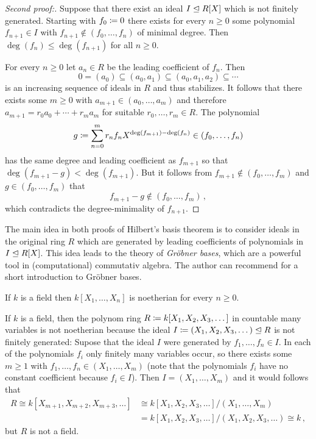 \begin{proof}[Second proof:]
  Suppose that there exist an ideal $I \trianglelefteq R[X]$ which is not finitely generated.
  Starting with $f_0 \coloneqq 0$ there exists for every $n \geq 0$ some polynomial $f_{n+1} \in I$ with $f_{n+1} \notin (f_0, \dotsc, f_n)$ of minimal degree.
  Then $\deg(f_n) \leq \deg(f_{n+1})$ for all $n \geq 0$.
  
  For every $n \geq 0$ let $a_n \in R$ be the leading coefficient of $f_n$.
  Then
  \[
              0
    =         (a_0)
    \subseteq (a_0, a_1)
    \subseteq (a_0, a_1, a_2)
    \subseteq \dotsb
  \]
  is an increasing sequence of ideals in $R$ and thus stabilizes.
  It follows that there exists some $m \geq 0$ with $a_{m+1} \in (a_0, \dotsc, a_m)$ and therefore $a_{m+1} = r_0 a_0 + \dotsb + r_m a_m$ for suitable $r_0, \dotsc, r_m \in R$.
  The polynomial
  \[
              g
    \coloneqq  \sum_{n=0}^m r_n f_n X^{\deg(f_{m+1}) - \deg(f_n)}
    \in       (f_0, \dotsc, f_n)
  \]
  has the same degree and leading coefficient as $f_{m+1}$ so that $\deg(f_{m+1} - g) < \deg(f_{m+1})$.
  But it follows from $f_{m+1} \notin (f_0, \dotsc, f_m)$ and $g \in (f_0, \dotsc, f_m)$ that
  \[
            f_{m+1} - g
    \notin  (f_0, \dotsc, f_m) \,,
  \]
  which contradicts the degree-minimality of $f_{n+1}$.
\end{proof}


\begin{remark}
  The main idea in both proofs of Hilbert’s basis theorem is to consider ideals in the original ring $R$ which are generated by leading coefficients of polynomials in $I \trianglelefteq R[X]$.
  This idea leads to the theory of \emph{Gröbner bases}, which are a powerful tool in (computational) commutativ algebra.
  The author can recommend \cite[Section~9.6]{DummitFoote2004} for a short introduction to Gröbner bases.
\end{remark}


\begin{example}
  If $k$ is a field then $k[X_1, \dotsc, X_n]$ is noetherian for every $n \geq 0$.
\end{example}


\begin{example}
  If $k$ is a field, then the polynom ring $R \coloneqq k[X_1, X_2, X_3, \dotsc]$ in countable many variables is not noetherian because the ideal $I \coloneqq (X_1, X_2, X_3, \dotsc) \trianglelefteq R$ is not finitely generated:
  Supose that the ideal $I$ were generated by $f_1, \dotsc, f_n \in I$.
  In each of the polynomials $f_i$ only finitely many variables occur, so there exists some $m \geq 1$ with $f_1, \dotsc, f_n \in (X_1, \dotsc, X_m)$ (note that the polynomials $f_i$ have no constant coefficient because $f_i \in I$).
  Then $I = (X_1, \dotsc, X_m)$ and it would follows that
  \begin{align*}
            R
     \cong  k[X_{m+1}, X_{m+2}, X_{m+3}, \dotsc]
    &\cong  k[X_1, X_2, X_3, \dotsc]/(X_1, \dotsc, X_m)  \\
    &=      k[X_1, X_2, X_3, \dotsc]/(X_1, X_2, X_3, \dotsc)
     \cong  k \,,
  \end{align*}
  but $R$ is not a field.
\end{example}



